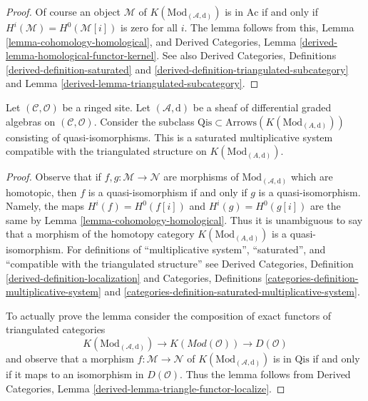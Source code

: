 \begin{proof}
Of course an object $\mathcal{M}$ of $K(\text{Mod}_{(\mathcal{A}, \text{d})})$
is in $\text{Ac}$ if and only if $H^i(\mathcal{M}) = H^0(\mathcal{M}[i])$
is zero for all $i$. The lemma follows from this,
Lemma \ref{lemma-cohomology-homological}, and
Derived Categories, Lemma \ref{derived-lemma-homological-functor-kernel}.
See also Derived Categories, Definitions \ref{derived-definition-saturated}
and \ref{derived-definition-triangulated-subcategory} and
Lemma \ref{derived-lemma-triangulated-subcategory}.
\end{proof}

\begin{lemma}
\label{lemma-qis}
Let $(\mathcal{C}, \mathcal{O})$ be a ringed site. Let
$(\mathcal{A}, \text{d})$ be a sheaf of differential graded algebras
on $(\mathcal{C}, \mathcal{O})$.
Consider the subclass
$\text{Qis} \subset \text{Arrows}(K(\text{Mod}_{(A, \text{d})}))$
consisting of quasi-isomorphisms. This is a saturated multiplicative
system compatible with the triangulated structure on
$K(\text{Mod}_{(A, \text{d})})$.
\end{lemma}

\begin{proof}
Observe that if $f , g : \mathcal{M} \to \mathcal{N}$ are morphisms
of $\text{Mod}_{(\mathcal{A}, \text{d})}$ which are homotopic,
then $f$ is a quasi-isomorphism if and only if $g$ is a quasi-isomorphism.
Namely, the maps $H^i(f) = H^0(f[i])$ and $H^i(g) = H^0(g[i])$ are
the same by Lemma \ref{lemma-cohomology-homological}. Thus it is
unambiguous to say that a morphism of the homotopy category
$K(\text{Mod}_{(A, \text{d})})$ is a quasi-isomorphism.
For definitions of ``multiplicative system'', ``saturated'', and
``compatible with the triangulated structure'' see
Derived Categories, Definition \ref{derived-definition-localization}
and
Categories, Definitions \ref{categories-definition-multiplicative-system}
and \ref{categories-definition-saturated-multiplicative-system}.

\medskip\noindent
To actually prove the lemma consider the composition
of exact functors of triangulated categories
$$
K(\text{Mod}_{(\mathcal{A}, \text{d})})
\longrightarrow
K(\textit{Mod}(\mathcal{O}))
\longrightarrow
D(\mathcal{O})
$$
and observe that a morphism $f : \mathcal{M} \to \mathcal{N}$
of $K(\text{Mod}_{(\mathcal{A}, \text{d})})$ is in $\text{Qis}$
if and only if it maps to an isomorphism in $D(\mathcal{O})$.
Thus the lemma follows from Derived Categories, Lemma
\ref{derived-lemma-triangle-functor-localize}.
\end{proof}

